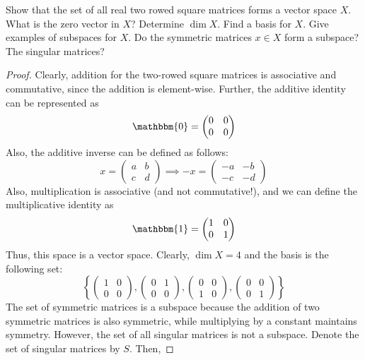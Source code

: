 \begin{question}
    Show that the set of all real two rowed square matrices forms a vector space $X$. What is the zero vector in $X$? Determine $\dim X$. Find a basis for $X$. Give examples of subspaces for $X$. Do the symmetric matrices $x \in X$ form a subspace? The singular matrices?
    \label{section2.1-12}
\end{question}
\begin{proof}
    Clearly, addition for the two-rowed square matrices is associative and commutative, since the addition is element-wise. Further, the additive identity can be represented as
    \[\mathbbm{0} = 
    \begin{pmatrix}
        0 & 0\\ 0 & 0
    \end{pmatrix}
    \]
    Also, the additive inverse can be defined as follows:
    \[x = \begin{pmatrix}a & b \\ c & d\end{pmatrix} \implies -x = \begin{pmatrix} -a & -b \\ -c & -d\end{pmatrix}\]
    Also, multiplication is associative (and not commutative!), and we can define the multiplicative identity as
    \[\mathbbm{1} = \begin{pmatrix} 1 & 0 \\ 0 & 1 \end{pmatrix}\]
    Thus, this space is a vector space. Clearly, $\dim X = 4$ and the basis is the following set:
    \[\left\{\begin{pmatrix} 1 & 0 \\ 0 & 0 \end{pmatrix} , \begin{pmatrix} 0 & 1 \\ 0 & 0 \end{pmatrix}, \begin{pmatrix} 0 & 0 \\ 1 & 0 \end{pmatrix}, \begin{pmatrix} 0 & 0\\0 & 1 \end{pmatrix}\right\}\]
    The set of symmetric matrices is a subspace because the addition of two symmetric matrices is also symmetric, while multiplying by a constant maintains symmetry. However, the set of all singular matrices is not a subspace. Denote the set of singular matrices by $S$. Then,

\end{proof}
